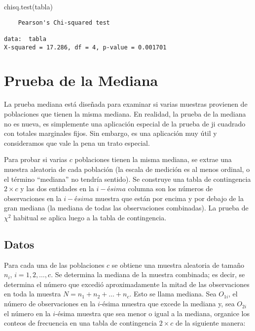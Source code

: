 \documentclass[
  a4paper,
  oneside,
  openany]{book}
\newenvironment{Shaded}{\begin{snugshade}}{\end{snugshade}}
\newcommand{\FunctionTok}[1]{\textcolor[rgb]{0.00,0.00,0.00}{#1}}
\newcommand{\NormalTok}[1]{#1}
\begin{document}
\begin{Shaded}
\begin{Highlighting}[]
\FunctionTok{chisq.test}\NormalTok{(tabla)}
\end{Highlighting}
\end{Shaded}

\begin{verbatim}
    Pearson's Chi-squared test

data:  tabla
X-squared = 17.286, df = 4, p-value = 0.001701
\end{verbatim}

\hypertarget{prueba-de-la-mediana}{%
\chapter{Prueba de la Mediana}\label{prueba-de-la-mediana}}

La prueba mediana está diseñada para examinar si varias muestras provienen de poblaciones que tienen la misma mediana. En realidad, la prueba de la mediana no es nueva, es simplemente una aplicación especial de la prueba de ji cuadrado con totales marginales fijos. Sin embargo, es una aplicación muy útil y consideramos que vale la pena un trato especial.

Para probar si varias \(c\) poblaciones tienen la misma mediana, se extrae una muestra aleatoria de cada población (la escala de medición es al menos ordinal, o el término ``mediana'' no tendría sentido). Se construye una tabla de contingencia \(2\times c\) y las dos entidades en la \(i-ésima\) columna son los números de observaciones en la \(i-ésima\) muestra que están por encima y por debajo de la gran mediana (la mediana de todas las observaciones combinadas). La prueba de \(\chi^2\) habitual se aplica luego a la tabla de contingencia.

\hypertarget{datos-13}{%
\section{Datos}\label{datos-13}}

Para cada una de las poblaciones \(c\) se obtiene una muestra aleatoria de tamaño \(n_{i}\), \(i = 1,2,\ldots, c\). Se determina la mediana de la muestra combinada; es decir, se determina el número que excedió aproximadamente la mitad de las observaciones en toda la muestra \(N = n_{1} + n_{2}+ \ldots + n_{c}\). Esto se llama mediana. Sea \(O_{1i}\), el número de observaciones en la \(i\)-ésima muestra que excede la mediana y, sea \(O_{2i}\) el número en la \(i\)-ésima muestra que sea menor o igual a la mediana, organice los conteos de frecuencia en una tabla de contingencia \(2\times c\) de la siguiente manera:
\end{document}
